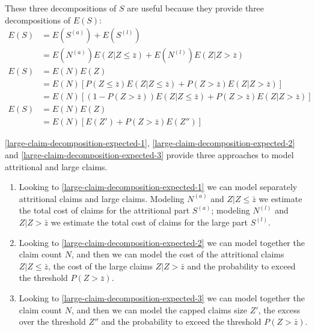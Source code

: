 \documentclass[a4paper, nobind]{templates/ociamthesis}
\providecommand{\tightlist}{%
  \setlength{\itemsep}{0pt}\setlength{\parskip}{0pt}}
\theoremstyle{definition}
\theoremstyle{definition}
\theoremstyle{definition}
\theoremstyle{remark}
\begin{document}
These three decompositions of \(S\) are useful because they provide three decompositions of \(E(S)\):
\begin{align}
  \nonumber
  E(S) & = E(S^{(a)}) + E(S^{(l)}) \\
    \label{large-claim-decomposition-expected-1}
    & = E(N^{(a)}) E(Z|Z\le\bar{z}) + E(N^{(l)}) E(Z|Z>\bar{z}) \\[12pt]
  \nonumber
  E(S) & = E(N) E(Z) \\
    \nonumber
    & = E(N) \left[P(Z\le\bar{z}) E(Z|Z\le\bar{z}) + P(Z>\bar{z}) E(Z|Z > \bar{z}) \right] \\
    \label{large-claim-decomposition-expected-2}
    & = E(N) \left[\left( 1 - P(Z>\bar{z}) \right) E(Z|Z\le\bar{z}) + P(Z>\bar{z}) E(Z|Z > \bar{z})\right] \\[12pt]
  \nonumber
  E(S) & = E(N) E(Z) \\
    \label{large-claim-decomposition-expected-3}
    & = E(N) \left[E(Z') + P(Z>\bar{z}) E(Z'')\right]
\end{align}

\ref{large-claim-decomposition-expected-1}, \ref{large-claim-decomposition-expected-2} and \ref{large-claim-decomposition-expected-3} provide three approaches to model attritional and large claims.

\begin{enumerate}
\def\labelenumi{\arabic{enumi}.}
\tightlist
\item
  Looking to \ref{large-claim-decomposition-expected-1} we can model separately attritional claims and large claims. Modeling \(N^{(a)}\) and \(Z|Z\le\bar{z}\) we estimate the total cost of claims for the attritional part \(S^{(a)}\); modeling \(N^{(l)}\) and \(Z|Z>\bar{z}\) we estimate the total cost of claims for the large part \(S^{(l)}\).
\item
  Looking to \ref{large-claim-decomposition-expected-2} we can model together the claim count \(N\), and then we can model the cost of the attritional claims \(Z|Z\le\bar{z}\), the cost of the large claims \(Z|Z>\bar{z}\) and the probability to exceed the threshold \(P(Z>\bar{z})\).
\item
  Looking to \ref{large-claim-decomposition-expected-3} we can model together the claim count \(N\), and then we can model the capped claims size \(Z'\), the excess over the threshold \(Z''\) and the probability to exceed the threshold \(P(Z>\bar{z})\).
\end{enumerate}
\end{document}
